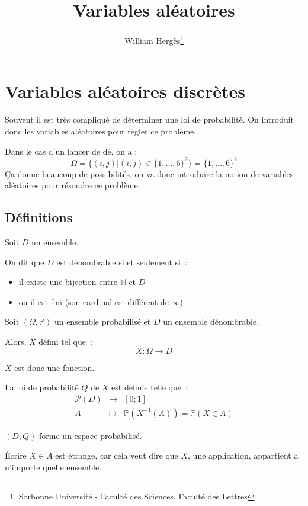 \documentclass[a4paper, titlepage]{article}
\title{Variables aléatoires}
\author{William Hergès\thanks{Sorbonne Université - Faculté des Sciences, Faculté des Lettres}}
\begin{document}
	\maketitle
	\tableofcontents
	\newpage
	\section{Variables aléatoires discrètes}
	Souvent il est très compliqué de déterminer une loi de probabilité. On introduit donc les variables aléatoires pour régler ce problème.

	Dans le cas d'un lancer de dé, on a :
	$$ \Omega = \{(i,j)|(i,j)\in\{1,\ldots,6\}^2\} = \{1,\ldots,6\}^2 $$
	Ça donne beaucoup de possibilités, on va donc introduire la notion de variables aléatoires pour résoudre ce problème.

	\subsection{Définitions}
	\begin{defn}
		Soit $D$ un ensemble.

		On dit que $D$ est dénombrable si et seulement si~:
		\begin{itemize}
			\item il existe une bijection entre $\mathbb{N}$ et $D$
			\item ou il est fini (son cardinal est différent de $\infty$)
		\end{itemize}
	\end{defn}

	\begin{defn}
		Soit $(\Omega,\mathbb{P})$ un ensemble probabilisé et $D$ un ensemble dénombrable.

		Alors, $X$ défini tel que~:
		$$ X:\Omega \to D $$
	\end{defn}
	$X$ est donc une fonction.

	\begin{defn}
		La loi de probabilité $Q$ de $X$ est définie telle que~:
		$$\begin{matrix}
			\mathcal{P}(D) &\to &[0;1]\\
			A & \longmapsto & \mathbb{P}(X^{-1}(A)) = \mathbb{P}(X\in A)
		\end{matrix}$$
	\end{defn}
	$(D,Q)$ forme un espace probabilisé.
	
	Écrire $X\in A$ est étrange, car cela veut dire que $X$, une application, appartient à n'importe quelle ensemble.
\end{document}
